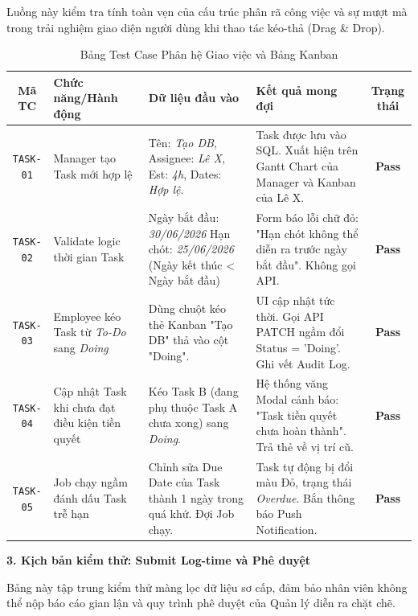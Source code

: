 \documentclass[a4paper,13.5pt]{extreport}
\begin{document}
Luồng này kiểm tra tính toàn vẹn của cấu trúc phân rã công việc và sự mượt mà trong trải nghiệm giao diện người dùng khi thao tác kéo-thả (Drag \& Drop).

\begin{table}[H]
    \centering
    \renewcommand{\arraystretch}{1.4}
    \begin{tabularx}{\textwidth}{|c|p{3.5cm}|X|X|c|}
    \hline
    \textbf{Mã TC} & \textbf{Chức năng/Hành động} & \textbf{Dữ liệu đầu vào} & \textbf{Kết quả mong đợi} & \textbf{Trạng thái} \\
    \hline
    \texttt{TASK-01} & Manager tạo Task mới hợp lệ & Tên: \textit{Tạo DB}, Assignee: \textit{Lê X}, Est: \textit{4h}, Dates: \textit{Hợp lệ}. & Task được lưu vào SQL. Xuất hiện trên Gantt Chart của Manager và Kanban của Lê X. & \textbf{Pass} \\
    \hline
    \texttt{TASK-02} & Validate logic thời gian Task & Ngày bắt đầu: \textit{30/06/2026} \newline Hạn chót: \textit{25/06/2026} (Ngày kết thúc < Ngày bắt đầu) & Form báo lỗi chữ đỏ: "Hạn chót không thể diễn ra trước ngày bắt đầu". Không gọi API. & \textbf{Pass} \\
    \hline
    \texttt{TASK-03} & Employee kéo Task từ \textit{To-Do} sang \textit{Doing} & Dùng chuột kéo thẻ Kanban "Tạo DB" thả vào cột "Doing". & UI cập nhật tức thời. Gọi API PATCH ngầm đổi Status = 'Doing'. Ghi vết Audit Log. & \textbf{Pass} \\
    \hline
    \texttt{TASK-04} & Cập nhật Task khi chưa đạt điều kiện tiền quyết & Kéo Task B (đang phụ thuộc Task A chưa xong) sang \textit{Doing}. & Hệ thống văng Modal cảnh báo: "Task tiền quyết chưa hoàn thành". Trả thẻ về vị trí cũ. & \textbf{Pass} \\
    \hline
    \texttt{TASK-05} & Job chạy ngầm đánh dấu Task trễ hạn & Chỉnh sửa Due Date của Task thành 1 ngày trong quá khứ. Đợi Job chạy. & Task tự động bị đổi màu Đỏ, trạng thái \textit{Overdue}. Bắn thông báo Push Notification. & \textbf{Pass} \\
    \hline
    \end{tabularx}
    \caption{Bảng Test Case Phân hệ Giao việc và Bảng Kanban}
    \label{tab:tc_task}
\end{table}

\textbf{3. Kịch bản kiểm thử: Submit Log-time và Phê duyệt}

Bảng này tập trung kiểm thử màng lọc dữ liệu sơ cấp, đảm bảo nhân viên không thể nộp báo cáo gian lận và quy trình phê duyệt của Quản lý diễn ra chặt chẽ.
\end{document}
